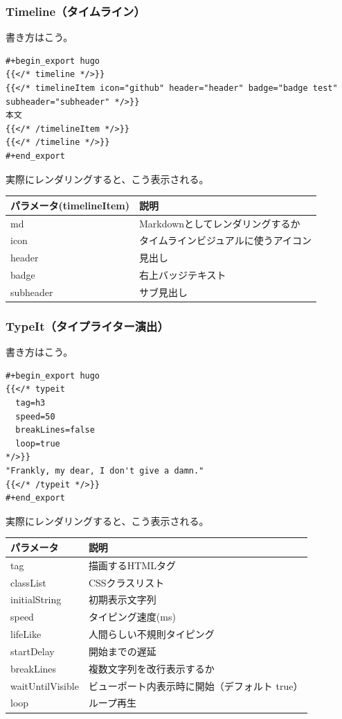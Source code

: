 \documentclass[11pt]{article}
\begin{document}
\subsubsection{Timeline（タイムライン）}
\label{sec:orge1d71db}

書き方はこう。

\begin{verbatim}
#+begin_export hugo
{{</* timeline */>}}
{{</* timelineItem icon="github" header="header" badge="badge test" subheader="subheader" */>}}
本文
{{</* /timelineItem */>}}
{{</* /timeline */>}}
#+end_export
\end{verbatim}

実際にレンダリングすると、こう表示される。

\begin{center}
\begin{tabular}{ll}
パラメータ(timelineItem) & 説明\\
\hline
md & Markdownとしてレンダリングするか\\
icon & タイムラインビジュアルに使うアイコン\\
header & 見出し\\
badge & 右上バッジテキスト\\
subheader & サブ見出し\\
\end{tabular}
\end{center}
\subsubsection{TypeIt（タイプライター演出）}
\label{sec:org261866b}

書き方はこう。

\begin{verbatim}
#+begin_export hugo
{{</* typeit
  tag=h3
  speed=50
  breakLines=false
  loop=true
*/>}}
"Frankly, my dear, I don't give a damn."
{{</* /typeit */>}}
#+end_export
\end{verbatim}

実際にレンダリングすると、こう表示される。

\begin{center}
\begin{tabular}{ll}
パラメータ & 説明\\
\hline
tag & 描画するHTMLタグ\\
classList & CSSクラスリスト\\
initialString & 初期表示文字列\\
speed & タイピング速度(ms)\\
lifeLike & 人間らしい不規則タイピング\\
startDelay & 開始までの遅延\\
breakLines & 複数文字列を改行表示するか\\
waitUntilVisible & ビューポート内表示時に開始（デフォルト true）\\
loop & ループ再生\\
\end{tabular}
\end{center}
\end{document}
